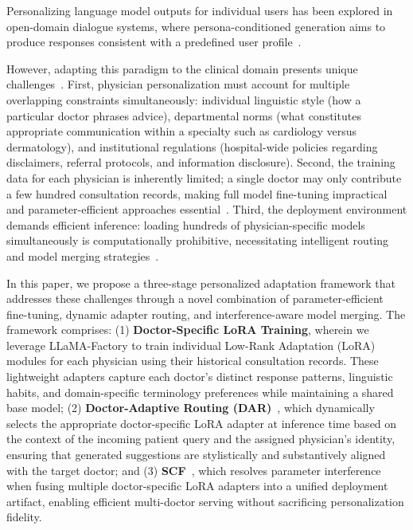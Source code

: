 Personalizing language model outputs for individual users has been explored in open-domain dialogue systems, where persona-conditioned generation aims to produce responses consistent with a predefined user profile~\cite{zhang2018personalizing}.

However, adapting this paradigm to the clinical domain presents unique challenges~\cite{zhang2018personalizing}. First, physician personalization must account for multiple overlapping constraints simultaneously: individual linguistic style (how a particular doctor phrases advice), departmental norms (what constitutes appropriate communication within a specialty such as cardiology versus dermatology), and institutional regulations (hospital-wide policies regarding disclaimers, referral protocols, and information disclosure). Second, the training data for each physician is inherently limited; a single doctor may only contribute a few hundred consultation records, making full model fine-tuning impractical and parameter-efficient approaches essential~\cite{hu2021lora,peft}. Third, the deployment environment demands efficient inference: loading hundreds of physician-specific models simultaneously is computationally prohibitive, necessitating intelligent routing and model merging strategies~\cite{yadavTIESMergingResolvingInterference2023a,huangLoraHubEfficientCrossTask2024,ilharco2023editing}.

In this paper, we propose a three-stage personalized adaptation framework that addresses these challenges through a novel combination of parameter-efficient fine-tuning, dynamic adapter routing, and interference-aware model merging. The framework comprises: (1) \textbf{Doctor-Specific LoRA Training}, wherein we leverage LLaMA-Factory to train individual Low-Rank Adaptation (LoRA) modules for each physician using their historical consultation records. These lightweight adapters capture each doctor's distinct response patterns, linguistic habits, and domain-specific terminology preferences while maintaining a shared base model; (2) \textbf{Doctor-Adaptive Routing (DAR)}~\cite{huangLoraHubEfficientCrossTask2024}, which dynamically selects the appropriate doctor-specific LoRA adapter at inference time based on the context of the incoming patient query and the assigned physician's identity, ensuring that generated suggestions are stylistically and substantively aligned with the target doctor; and (3) \textbf{SCF}~\cite{yadavTIESMergingResolvingInterference2023a}, which resolves parameter interference when fusing multiple doctor-specific LoRA adapters into a unified deployment artifact, enabling efficient multi-doctor serving without sacrificing personalization fidelity.

